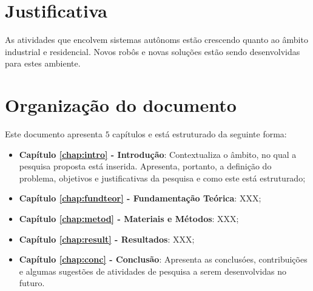 \section{Justificativa}
\label{sec:justi}

As atividades que encolvem sistemas autônoms estão crescendo quanto ao âmbito industrial e residencial. Novos robôs e novas soluções estão sendo desenvolvidas para estes ambiente.




\section{Organização do documento}
\label{section:organizacao}

Este documento apresenta $5$ capítulos e está estruturado da seguinte forma:

\begin{itemize}

  \item \textbf{Capítulo \ref{chap:intro} - Introdução}: Contextualiza o âmbito, no qual a pesquisa proposta está inserida. Apresenta, portanto, a definição do problema, objetivos e justificativas da pesquisa e como este \thetypeworkthree está estruturado;
  \item \textbf{Capítulo \ref{chap:fundteor} - Fundamentação Teórica}: XXX;
  \item \textbf{Capítulo \ref{chap:metod} - Materiais e Métodos}: XXX;
  \item \textbf{Capítulo \ref{chap:result} - Resultados}: XXX;
  \item \textbf{Capítulo \ref{chap:conc} - Conclusão}: Apresenta as conclusóes, contribuições e algumas sugestões de atividades de pesquisa a serem desenvolvidas no futuro.

\end{itemize}
